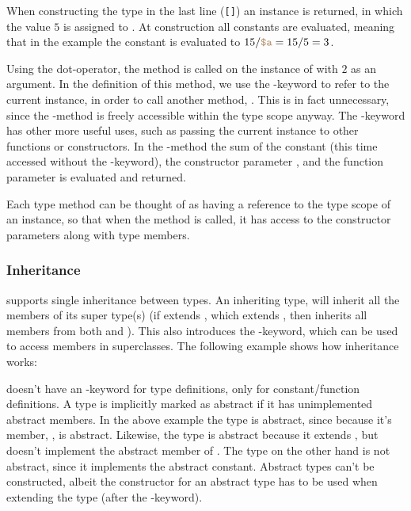 When constructing the type in the last line (\texttt{[]})
an instance is returned, in which the value $5$ is assigned to .
At construction all constants are evaluated, meaning that in the example
the constant  is evaluated to $15 / \variable{a} = 15 / 5 = 3$.

Using the dot-operator, the method  is called on the instance of
 with $2$ as an argument. In the definition of this method, we use the
-keyword to refer to the current instance, in order to call another
method, . This is in fact unnecessary, since the
-method is freely accessible within the type scope anyway. The
-keyword has other more useful uses, such as passing the current
instance to other functions or constructors. In the -method
the sum of the constant  (this time accessed without the
-keyword), the constructor parameter , and the function
parameter  is evaluated and returned.

Each type method can be thought of as having a reference to the type scope of an
instance, so that when the method is called, it has access to the constructor 
parameters along with type members.

\subsubsection{Inheritance}

\productname{} supports single inheritance between types. An inheriting type, will
inherit all the members of its super type(s) (if  extends , which
extends , then  inherits all members from both  and ).
This also introduces the -keyword, which can be used to access members
in superclasses. The following example shows how inheritance works:


\productname{} doesn't have an -keyword for type definitions, only
for constant/function definitions. A type is implicitly marked as abstract if it has
unimplemented abstract members. In the above example the type  is abstract,
since because it's member, , is abstract. Likewise, the type
 is abstract because it extends , but doesn't implement the abstract
member of . The type  on the other hand is not abstract, since it
implements the abstract constant. Abstract types can't be constructed, albeit the
constructor for an abstract type has to be used when extending the type (after the
-keyword).


